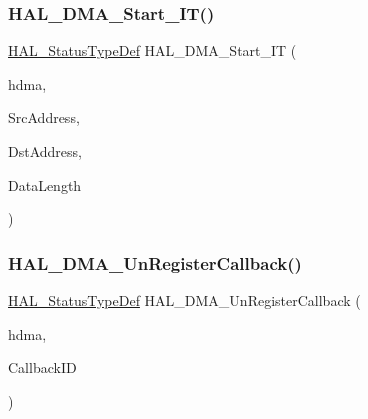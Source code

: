 \mbox{\label{group___d_m_a___exported___functions___group2_ga7eddc0931ac8a3d77b23d6d5e68407c7}} 
\subsubsection{\texorpdfstring{H\+A\+L\+\_\+\+D\+M\+A\+\_\+\+Start\+\_\+\+I\+T()}{HAL\_DMA\_Start\_IT()}}
{\footnotesize\ttfamily \hyperlink{stm32f4xx__hal__def_8h_a63c0679d1cb8b8c684fbb0632743478f}{H\+A\+L\+\_\+\+Status\+Type\+Def} H\+A\+L\+\_\+\+D\+M\+A\+\_\+\+Start\+\_\+\+IT (\begin{DoxyParamCaption}\item[{\hyperlink{group___d_m_a___exported___types_ga41b754a906b86bce54dc79938970138b}{D\+M\+A\+\_\+\+Handle\+Type\+Def} $\ast$}]{hdma,  }\item[{uint32\+\_\+t}]{Src\+Address,  }\item[{uint32\+\_\+t}]{Dst\+Address,  }\item[{uint32\+\_\+t}]{Data\+Length }\end{DoxyParamCaption})}

\mbox{\label{group___d_m_a___exported___functions___group2_ga87842d3780f0e54c7fb29a003e6b5ac4}} 
\subsubsection{\texorpdfstring{H\+A\+L\+\_\+\+D\+M\+A\+\_\+\+Un\+Register\+Callback()}{HAL\_DMA\_UnRegisterCallback()}}
{\footnotesize\ttfamily \hyperlink{stm32f4xx__hal__def_8h_a63c0679d1cb8b8c684fbb0632743478f}{H\+A\+L\+\_\+\+Status\+Type\+Def} H\+A\+L\+\_\+\+D\+M\+A\+\_\+\+Un\+Register\+Callback (\begin{DoxyParamCaption}\item[{\hyperlink{group___d_m_a___exported___types_ga41b754a906b86bce54dc79938970138b}{D\+M\+A\+\_\+\+Handle\+Type\+Def} $\ast$}]{hdma,  }\item[{\hyperlink{group___d_m_a___exported___types_gafbe8b2bd9ce2128de6cdc08ccde7e8ad}{H\+A\+L\+\_\+\+D\+M\+A\+\_\+\+Callback\+I\+D\+Type\+Def}}]{Callback\+ID }\end{DoxyParamCaption})}

